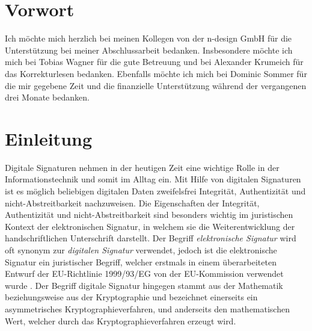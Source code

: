 \documentclass[11pt,a4paper,ngerman]{scrreprt}
\begin{document}



\chapter*{Vorwort}
Ich möchte mich herzlich bei meinen Kollegen von der n-design GmbH für die Unterstützung bei meiner Abschlussarbeit bedanken. Insbesondere möchte ich mich bei Tobias Wagner für die gute Betreuung und bei Alexander Krumeich für das Korrekturlesen bedanken. Ebenfalls möchte ich mich bei Dominic Sommer für die mir gegebene Zeit und die finanzielle Unterstützung während der vergangenen drei Monate bedanken.
\clearpage

\tableofcontents
\clearpage


\chapter{Einleitung}
Digitale Signaturen nehmen in der heutigen Zeit eine wichtige Rolle in der Informationstechnik und somit im Alltag ein. Mit Hilfe von digitalen Signaturen ist es möglich beliebigen digitalen Daten zweifelsfrei Integrität, Authentizität und nicht-Abstreitbarkeit nachzuweisen. Die Eigenschaften der Integrität, Authentizität und nicht-Abstreitbarkeit sind besonders wichtig im juristischen Kontext der elektronischen Signatur, in welchem sie die Weiterentwicklung der handschriftlichen Unterschrift darstellt. Der Begriff \emph{elektronische Signatur} wird oft synonym zur \emph{digitalen Signatur} verwendet, jedoch ist die elektronische Signatur ein juristischer Begriff, welcher erstmals in einem überarbeiteten Entwurf der EU-Richtlinie 1999/93/EG von der EU-Kommission verwendet wurde \cite{eSigEU99}. Der Begriff digitale Signatur hingegen stammt aus der Mathematik beziehungsweise aus der Kryptographie und bezeichnet einerseits ein asymmetrisches Kryptographieverfahren, und anderseits den mathematischen Wert, welcher durch das Kryptographieverfahren erzeugt wird.
\end{document}
